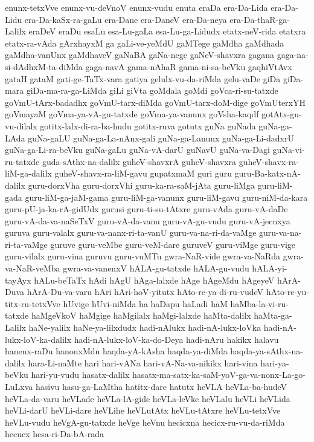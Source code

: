 {enunx-tetxVve
enunx-vu-deVnoV
enunx-vudu
enuta
eraDa
era-Da-Lida
era-Da-Lidu
era-Da-kaSx-ra-gaLu
era-Dane
era-DaneV
era-Da-neya
era-Da-thaR-ga-Lalilx
eraDeV
eraDu
esaLu
esa-Lu-gaLa
esa-Lu-ga-Lidudx
etatx-neV-rida
etatxra
etatx-ra-vAda
gArxhayxM
ga
gaLi-ve-yeMdU
gaMTege
gaMdha
gaMdhada
gaMdha-vanUnx
gaMdhaveV
gaNaBA
gaNa-nege
gaNeV-shavxra
gagana
gaga-na-si-dAdhxM-ta-diMda
gaga-navA
gama-nAhaR
gama-ni-sa-beVku
gaqhiVtAvx
gataH
gataM
gati-ge-TaTx-vara
gatiya
gelulx-vu-da-riMda
gelu-vaDe
giDa
giDa-mara
giDa-ma-ra-ga-LiMda
giLi
giVta
goMdala
goMdi
goVca-ri-su-tatxde
goVmU-tArx-badadhx
goVmU-tarx-diMda
goVmU-tarx-doM-dige
goVmUterxYH
goVmayaM
goVma-ya-vA-gu-tatxde
goVma-ya-vanunx
goVsha-kaqdf
gotAtx-gu-vu-dilalx
gotitx-lalx-di-ra-ba-hudu
gotitx-ruva
gotutx
guNa
guNada
guNa-ga-LAda
guNa-gaLU
guNa-ga-La-nAnx-gali
guNa-ga-Lanunx
guNa-ga-Li-dadxrU
guNa-ga-Li-ra-beVku
guNa-gaLu
guNa-vA-darU
guNavU
guNa-va-Dagi
guNa-vi-ru-tatxde
guda-sAthx-na-dalilx
guheV-shavxrA
guheV-shavxra
guheV-shavx-ra-liM-ga-dalilx
guheV-shavx-ra-liM-gavu
gupatxmaM
guri
guru
guru-Ba-katx-nA-dalilx
guru-dorxVha
guru-dorxVhi
guru-ka-ra-saM-jAta
guru-liMga
guru-liM-gada
guru-liM-ga-jaM-gama
guru-liM-ga-vanunx
guru-liM-gavu
guru-niM-da-kara
guru-pU-ja-ka-rA-gidUdx
gurusi
guru-ti-su-tAtxre
guru-vAda
guru-vA-daDe
guru-vA-da-va-naSeTxV
guru-vA-da-vanu
guru-vA-gu-vudu
guru-vA-jecnxya
guruva
guru-valalx
guru-va-nanx-ri-ta-vanU
guru-va-na-ri-da-vaMge
guru-va-na-ri-ta-vaMge
guruve
guru-veMbe
guru-veM-dare
guruveV
guru-viMge
guru-vige
guru-vilalx
guru-vina
guruvu
guru-vuMTu
gwra-NaR-vide
gwra-va-NaRda
gwra-va-NaR-veMba
gwra-va-vanenxV
hALA-gu-tatxde
hALA-gu-vudu
hALA-yi-tayAyx
hALu-beTaTx
hAdi
hAgU
hAga-lalxde
hAge
hAgeMdu
hAgeyeV
hArA-Duva
hArA-Du-va-varu
hAri
hAri-hoV-yitutx
hAto-re-ya-di-ru-vudeV
hAto-re-yu-titx-ru-tetxVve
hUvige
hUvi-niMda
ha
haDapu
haLadi
haM
haMba-la-vi-ru-tatxde
haMgeVkoV
haMgige
haMgilalx
haMgi-lalxde
haMta-dalilx
haMta-ga-Lalilx
haNe-yalilx
haNe-ya-lilxdudx
hadi-nAlukx
hadi-nA-lukx-loVka
hadi-nA-lukx-loV-ka-dalilx
hadi-nA-lukx-loV-ka-do-Deya
hadi-nAru
hakikx
halavu
hanenx-raDu
hanonxMdu
haqda-yA-kAsha
haqda-ya-diMda
haqda-ya-sAthx-na-dalilx
hara-Li-naMte
hari
hari-vANa
hari-vA-Na-va-nikikx
hari-vina
hari-ya-beVku
hari-yu-vudu
hasatx-dalilx
hasatx-ma-satx-ka-saM-yoV-ga-va-nonx-La-go-LuLxva
hasivu
hasu-ga-LaMtha
hatitx-dare
hatutx
heVLA
heVLa-ba-hudeV
heVLa-da-varu
heVLade
heVLa-lA-gide
heVLa-leVke
heVLalu
heVLi
heVLida
heVLi-darU
heVLi-dare
heVLihe
heVLutAtx
heVLu-tAtxre
heVLu-tetxVve
heVLu-vudu
heVgA-gu-tatxde
heVge
heVnu
hecicxna
hecicx-ru-vu-da-riMda
hecucx
hesa-ri-Da-bA-rada
}
